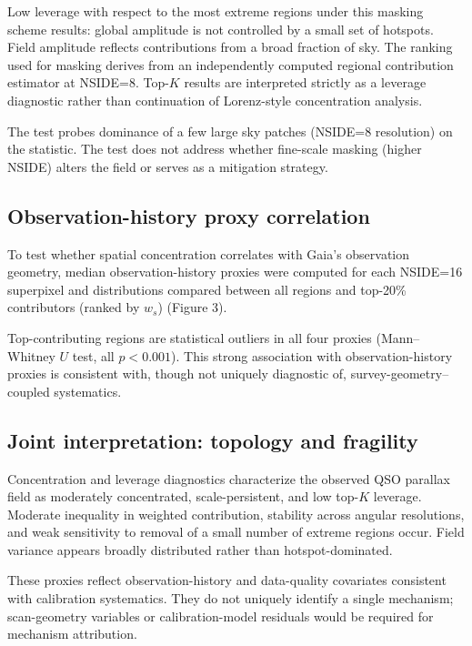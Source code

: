 \documentclass{aa}
\begin{document}
Low leverage with respect to the most extreme regions under this masking scheme results: global amplitude is not controlled by a small set of hotspots. Field amplitude reflects contributions from a broad fraction of sky. The ranking used for masking derives from an independently computed regional contribution estimator at NSIDE=8. Top-$K$ results are interpreted strictly as a leverage diagnostic rather than continuation of Lorenz-style concentration analysis.

The test probes dominance of a few large sky patches (NSIDE=8 resolution) on the statistic. The test does not address whether fine-scale masking (higher NSIDE) alters the field or serves as a mitigation strategy.

\subsection{Observation-history proxy correlation}

To test whether spatial concentration correlates with Gaia's observation geometry, median observation-history proxies were computed for each NSIDE=16 superpixel and distributions compared between all regions and top-20\% contributors (ranked by $w_s$) (Figure 3).

Top-contributing regions are statistical outliers in all four proxies (Mann--Whitney $U$ test, all $p < 0.001$). This strong association with observation-history proxies is consistent with, though not uniquely diagnostic of, survey-geometry--coupled systematics.

\subsection{Joint interpretation: topology and fragility}
Concentration and leverage diagnostics characterize the observed QSO parallax field as moderately concentrated, scale-persistent, and low top-$K$ leverage. Moderate inequality in weighted contribution, stability across angular resolutions, and weak sensitivity to removal of a small number of extreme regions occur. Field variance appears broadly distributed rather than hotspot-dominated.




These proxies reflect observation-history and data-quality covariates consistent with calibration systematics. They do not uniquely identify a single mechanism; scan-geometry variables or calibration-model residuals would be required for mechanism attribution.
\end{document}
